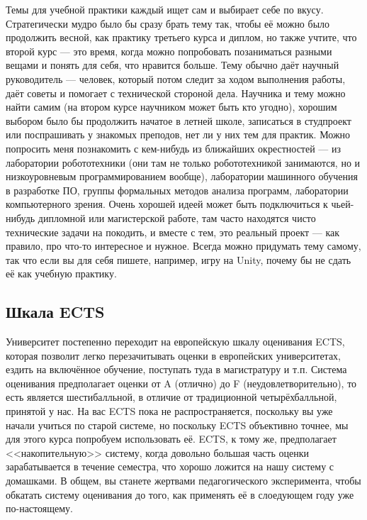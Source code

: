 \documentclass[a5paper]{article}
\begin{document}
Темы для учебной практики каждый ищет сам и выбирает себе по вкусу. Стратегически мудро было бы сразу брать тему так, чтобы её можно было продолжить весной, как практику третьего курса и диплом, но также учтите, что второй курс --- это время, когда можно попробовать позаниматься разными вещами и понять для себя, что нравится больше. Тему обычно даёт научный руководитель --- человек, который потом следит за ходом выполнения работы, даёт советы и помогает с технической стороной дела. Научника и тему можно найти самим (на втором курсе научником может быть кто угодно), хорошим выбором было бы продолжить начатое в летней школе, записаться в студпроект или поспрашивать у знакомых преподов, нет ли у них тем для практик. Можно попросить меня познакомить с кем-нибудь из ближайших окрестностей --- из лаборатории робототехники (они там не только робототехникой занимаются, но и низкоуровневым программированием вообще), лаборатории машинного обучения в разработке ПО, группы формальных методов анализа программ, лаборатории компьютерного зрения. Очень хорошей идеей может быть подключиться к чьей-нибудь дипломной или магистерской работе, там часто находятся чисто технические задачи на покодить, и вместе с тем, это реальный проект --- как правило, про что-то интересное и нужное. Всегда можно придумать тему самому, так что если вы для себя пишете, например, игру на Unity, почему бы не сдать её как учебную практику.

\subsection{Шкала ECTS}

Университет постепенно переходит на европейскую шкалу оценивания ECTS, которая позволит легко перезачитывать оценки в европейских университетах, ездить на включённое обучение, поступать туда в магистратуру и т.п. Система оценивания предполагает оценки от A (отлично) до F (неудовлетворительно), то есть является шестибалльной, в отличие от традиционной четырёхбалльной, принятой у нас. На вас ECTS пока не распространяется, поскольку вы уже начали учиться по старой системе, но поскольку ECTS объективно точнее, мы для этого курса попробуем использовать её. ECTS, к тому же, предполагает <<накопительную>> систему, когда довольно большая часть оценки зарабатывается в течение семестра, что хорошо ложится на нашу систему с домашками. В общем, вы станете жертвами педагогического эксперимента, чтобы обкатать систему оценивания до того, как применять её в слоедующем году уже по-настоящему.
\end{document}
